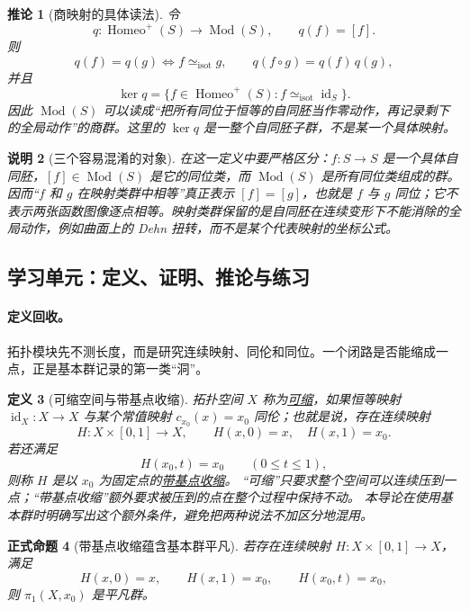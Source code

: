 \documentclass[UTF8,fontset=none,a4paper,11pt]{ctexart}
\theoremstyle{foundation-definition}
\newtheorem{definition}{定义}[section]
\theoremstyle{foundation-theorem}
\theoremstyle{foundation-proposition}
\newtheorem{proposition}[definition]{正式命题}
\theoremstyle{foundation-example}
\theoremstyle{foundation-remark}
\newtheorem{remark}[definition]{说明}
\theoremstyle{foundation-theorem}
\newtheorem{corollary}[definition]{推论}
\newcommand{\Mod}{\operatorname{Mod}}
\newcommand{\term}[2]{\hyperref[#1]{#2}}
\begin{document}
\begin{corollary}[商映射的具体读法]
令
\[
q:\operatorname{Homeo}^+(S)\longrightarrow\Mod(S),\qquad q(f)=[f].
\]
则
\[
q(f)=q(g)\iff f\simeq_{\mathrm{isot}}g,\qquad
q(f\circ g)=q(f)\,q(g),
\]
并且
\[
\ker q=\{f\in\operatorname{Homeo}^+(S):f\simeq_{\mathrm{isot}}\operatorname{id}_S\}.
\]
因此 \(\Mod(S)\) 可以读成“把所有同位于恒等的自同胚当作零动作，再记录剩下的全局动作”的商群。这里的 \(\ker q\) 是一整个自同胚子群，不是某一个具体映射。
\end{corollary}

\begin{remark}[三个容易混淆的对象]
在这一定义中要严格区分：\(f:S\to S\) 是一个具体自同胚，\([f]\in\Mod(S)\) 是它的同位类，而
\(\Mod(S)\) 是所有同位类组成的群。因而“\(f\) 和 \(g\) 在映射类群中相等”真正表示
\([f]=[g]\)，也就是 \(f\) 与 \(g\) 同位；它不表示两张函数图像逐点相等。映射类群保留的是自同胚在连续变形下不能消除的全局动作，例如曲面上的 Dehn 扭转，而不是某个代表映射的坐标公式。
\end{remark}

\subsection{学习单元：定义、证明、推论与练习}

\paragraph{定义回收。}
拓扑模块先不测长度，而是研究连续映射、同伦和同位。一个闭路是否能缩成一点，正是基本群记录的第一类“洞”。

\begin{definition}[可缩空间与带基点收缩]\label{def:contractible}
拓扑空间 \(X\) 称为\term{def:contractible}{可缩}，如果恒等映射
\(\operatorname{id}_X:X\to X\) 与某个常值映射
\(c_{x_0}(x)=x_0\) 同伦；也就是说，存在连续映射
\[
H:X\times[0,1]\longrightarrow X,
\qquad H(x,0)=x,\quad H(x,1)=x_0.
\]
若还满足
\[
H(x_0,t)=x_0\qquad(0\leq t\leq1),
\]
则称 \(H\) 是以 \(x_0\) 为固定点的\term{def:contractible}{带基点收缩}。
“可缩”只要求整个空间可以连续压到一点；“带基点收缩”额外要求被压到的点在整个过程中保持不动。
本导论在使用基本群时明确写出这个额外条件，避免把两种说法不加区分地混用。
\end{definition}

\begin{proposition}[带基点收缩蕴含基本群平凡]\label{prop:contractible-pi1}
若存在连续映射 \(H:X\times[0,1]\to X\)，满足
\[
H(x,0)=x,\qquad H(x,1)=x_0,\qquad H(x_0,t)=x_0,
\]
则 \(\pi_1(X,x_0)\) 是平凡群。
\end{proposition}
\end{document}
